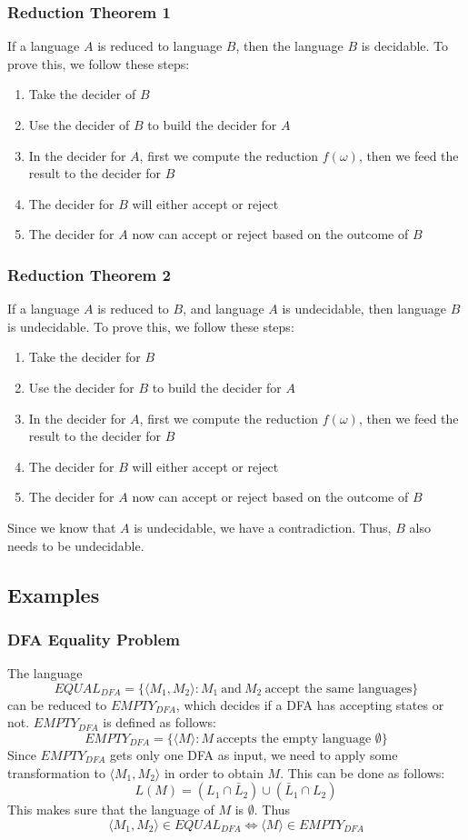 \documentclass{article}
\begin{document}
\subsubsection{Reduction Theorem 1}
If a language $A$ is reduced to language $B$, then the language $B$ is decidable. To prove this, we follow these steps:

\begin{enumerate}
	\item Take the decider of $B$
	\item Use the decider of $B$ to build the decider for $A$
	\item In the decider for $A$, first we compute the reduction $f(\omega)$, then we feed the result to the decider for $B$
	\item The decider for $B$ will either accept or reject
	\item The decider for $A$ now can accept or reject based on the outcome of $B$ 
\end{enumerate}

\subsubsection{Reduction Theorem 2}
If a language $A$ is reduced to $B$, and language $A$ is undecidable, then language $B$ is undecidable. To prove this, we follow these steps:
\begin{enumerate}
	\item Take the decider for $B$
	\item Use the decider for $B$ to build the decider for $A$
	\item In the decider for $A$, first we compute the reduction $f(\omega)$, then we feed the result to the decider for $B$
	\item The decider for $B$ will either accept or reject
	\item The decider for $A$ now can accept or reject based on the outcome of $B$
\end{enumerate}
Since we know that $A$ is undecidable, we have a contradiction. Thus, $B$ also needs to be undecidable.

\subsection{Examples}
\subsubsection{DFA Equality Problem}
The language
\[ EQUAL_{DFA} = \{ \langle M_1, M_2 \rangle : M_1~\text{and}~M_2~\text{accept the same languages}\} \]
can be reduced to $EMPTY_{DFA}$, which decides if a DFA has accepting states or not. $EMPTY_{DFA}$ is defined as follows:
\[ EMPTY_{DFA} = \{ \langle M \rangle : M~\text{accepts the empty language $\emptyset$} \} \]
Since $EMPTY_{DFA}$ gets only one DFA as input, we need to apply some transformation to $\langle M_1, M_2 \rangle$ in order to obtain $M$. This can be done as follows:
\[ L(M) = (L_1 \cap \bar L_2) \cup (\bar L_1 \cap L_2) \]
This makes sure that the language of $M$ is $\emptyset$. Thus
\[ \langle M_1, M_2 \rangle \in EQUAL_{DFA} \iff \langle M \rangle \in EMPTY_{DFA} \]
\end{document}

